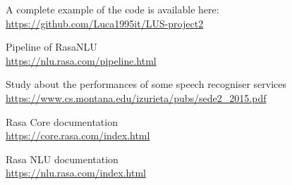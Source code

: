 \documentclass[11pt,a4paper]{article}
\begin{document}
A complete example of the code is available here: \url{https://github.com/Luca1995it/LUS-project2}

\bigskip


\begin{thebibliography}{2}

Pipeline of RasaNLU \\
\url{https://nlu.rasa.com/pipeline.html}

Study about the performances of some speech recogniser services \\
\url{https://www.cs.montana.edu/izurieta/pubs/sede2_2015.pdf}

Rasa Core documentation \\
\url{https://core.rasa.com/index.html}

Rasa NLU documentation \\
\url{https://nlu.rasa.com/index.html}

\end{thebibliography}
\end{document}
